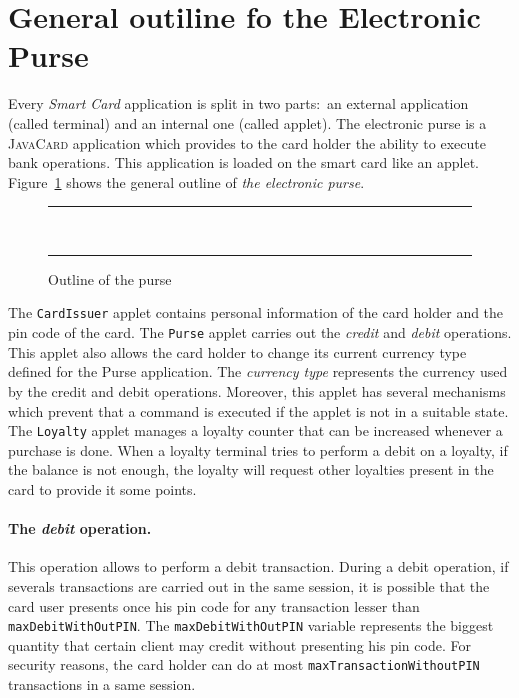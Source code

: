 \documentclass[a4paper]{llncs}
\begin{document}
\section{General outiline fo the Electronic Purse}
\label{SectGenPurse}

Every \textit{Smart Card} application is split in two
parts$:$ an external application (called terminal) and an
internal one (called applet). The electronic purse is a
\textsc{JavaCard} application which provides to the card holder
the ability to execute bank operations. This application is loaded on
the smart card like an applet. Figure~\ref{fig-cas-pur} shows the
general outline of \textit{the electronic purse}.




\begin{center}
\begin{figure}[hbt]
\rule{\linewidth}{0.3mm}
\\[2.5ex]
\centering
\mbox{\epsfxsize=11cm}
\caption{Outline of the purse}
\label{fig-cas-pur}
\rule{\linewidth}{0.3mm}
\end{figure}
\end{center}




The  \texttt{CardIssuer} applet contains personal information of the card
holder and the pin code of the card. The \texttt{Purse}
applet carries out the \textit{credit} and \textit{debit}
operations. This applet also allows the card holder to change its
current currency type defined for the Purse application. The
\textit{currency type} represents the
currency used by the credit and debit operations. Moreover,
this applet has several mechanisms
which prevent that a command is executed if the applet is not in a
suitable state. The \texttt{Loyalty} applet manages a loyalty counter
that can be increased whenever a purchase is done. When a loyalty
terminal tries to perform a debit on a loyalty, if the balance is not
enough, the loyalty will request other loyalties present in the card
to provide it some points.



\paragraph{\bf The \textit{debit} operation.}
This operation allows to perform a debit transaction. During a debit
operation, if severals transactions are carried out in the same
session, it is possible that
the card user presents once his pin code for any transaction lesser than
\texttt{maxDebitWithOutPIN}. The \texttt{maxDebitWithOutPIN} variable
represents the biggest quantity that certain client may credit without
presenting his pin code. For
security reasons, the card holder can do at most
\texttt{maxTransactionWithoutPIN} transactions in a same session. 
\end{document}
